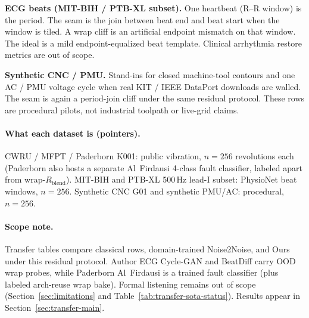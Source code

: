 \textbf{ECG beats (MIT-BIH / PTB-XL subset).}
One heartbeat (R--R window) is the period.
The seam is the join between beat end and beat start when the window is tiled.
A wrap cliff is an artificial endpoint mismatch on that window.
The ideal is a mild endpoint-equalized beat template.
Clinical arrhythmia restore metrics are out of scope.

\textbf{Synthetic CNC / PMU.}
Stand-ins for closed machine-tool contours and one AC / PMU voltage cycle when real KIT / IEEE DataPort downloads are walled.
The seam is again a period-join cliff under the same residual protocol.
These rows are procedural pilots, not industrial toolpath or live-grid claims.

\paragraph{What each dataset is (pointers).}
CWRU / MFPT / Paderborn K001: public vibration, $n{=}256$ revolutions each (Paderborn also hosts a separate Al~Firdausi 4-class fault classifier, labeled apart from wrap-$R_{\mathrm{blend}}$).
MIT-BIH and PTB-XL 500\,Hz lead-I subset: PhysioNet beat windows, $n{=}256$.
Synthetic CNC G01 and synthetic PMU/AC: procedural, $n{=}256$.

\paragraph{Scope note.}
Transfer tables compare classical rows, domain-trained Noise2Noise, and Ours under this residual protocol.
Author ECG Cycle-GAN and BeatDiff carry OOD wrap probes, while Paderborn Al~Firdausi is a trained fault classifier (plus labeled arch-reuse wrap bake).
Formal listening remains out of scope (Section~\ref{sec:limitations} and Table~\ref{tab:transfer-sota-status}).
Results appear in Section~\ref{sec:transfer-main}.

